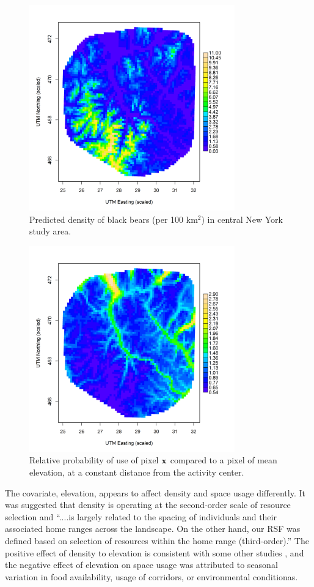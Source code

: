 \begin{figure}
\centering
\includegraphics[width=3.5in,height=3.5in]{Ch13-RSF/figs/density2.png}
\caption{Predicted density of black bears (per 100 km$^2$) in central New York study
  area.
}
\label{fig.density}
\end{figure}


\begin{figure}
\centering
\includegraphics[width=3.5in,height=3.5in]{Ch13-RSF/figs/spaceusage2.png}
\caption{Relative probability of use of pixel ${\bf x}$ compared to a pixel
  of mean elevation, at a constant distance from the activity center.
}
\label{fig.spaceusage}
\end{figure}


The covariate, elevation, appears to affect
 density and space usage
differently.  It was suggested that 
density is operating at the second-order scale of resource selection
and ``....is largely related to the spacing of individuals and their
associated home ranges across the landscape.   On the other hand, our RSF was defined
based on selection of resources within the home range (third-order).'' \citep{royle_etal:2012mee}
The positive effect of density to elevation is consistent with some
other studies  \citep[e.g.][]{frary_etal:2011}, and 
the negative effect of elevation 
on space usage was attributed to seasonal variation in food
availability, usage of corridors, or environmental conditionas.


